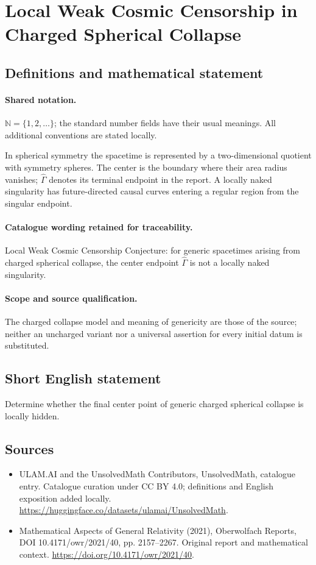 \documentclass[11pt]{article}
\begin{document}
\section{Local Weak Cosmic Censorship in Charged Spherical Collapse}\label{statement}

\subsection{Definitions and mathematical statement}

\paragraph{Shared notation.}$\mathbb N=\{1,2,\ldots\}$; the standard number fields have their usual meanings. All additional conventions are stated locally.


In spherical symmetry the spacetime is represented by a two-dimensional quotient with symmetry spheres. The center is the boundary where their area radius vanishes; $\widehat\Gamma$ denotes its terminal endpoint in the report. A locally naked singularity has future-directed causal curves entering a regular region from the singular endpoint.

\paragraph{Catalogue wording retained for traceability.}
Local Weak Cosmic Censorship Conjecture: for generic spacetimes arising from charged spherical collapse, the center endpoint $\widehat{\Gamma}$ is not a locally naked singularity.

\paragraph{Scope and source qualification.}The charged collapse model and meaning of genericity are those of the source; neither an uncharged variant nor a universal assertion for every initial datum is substituted.
\subsection{Short English statement}
Determine whether the final center point of generic charged spherical collapse is locally hidden.
\subsection{Sources}
\begin{itemize}
\item[\hypertarget{source:statement:1}{S1}] ULAM.AI and the UnsolvedMath Contributors, UnsolvedMath, catalogue entry. Catalogue curation under CC BY 4.0; definitions and English exposition added locally.
\url{https://huggingface.co/datasets/ulamai/UnsolvedMath}.
\item[\hypertarget{source:statement:2}{S2}] Mathematical Aspects of General Relativity (2021), Oberwolfach Reports, DOI 10.4171/owr/2021/40, pp. 2157--2267. Original report and mathematical context.
\url{https://doi.org/10.4171/owr/2021/40}.
\end{itemize}
\label{end:statement}
\end{document}
